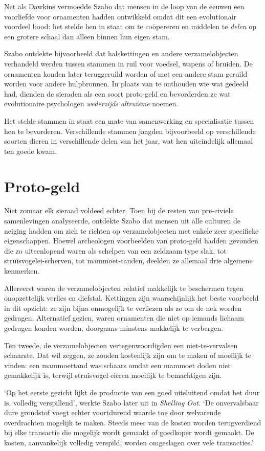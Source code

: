 \documentclass[
  a5paper,
  smalldemyvopaper,11pt,twoside,onecolumn,openright,extrafontsizes,
hidelinks]{memoir}
\begin{document}
Net als Dawkins vermoedde Szabo dat mensen in de loop van de eeuwen een
voorliefde voor ornamenten hadden ontwikkeld omdat dit een evolutionair
voordeel bood: het stelde hen in staat om te coöpereren en middelen te
\emph{delen} op een grotere schaal dan alleen binnen hun eigen stam.

Szabo ontdekte bijvoorbeeld dat halskettingen en andere verzamelobjecten
verhandeld werden tussen stammen in ruil voor voedsel, wapens of
bruiden. De ornamenten konden later teruggeruild worden of met een
andere stam geruild worden voor andere hulpbronnen. In plaats van te
onthouden wie wat gedeeld had, dienden de sieraden als een soort
proto-geld en bevorderden ze wat evolutionaire psychologen
\emph{wederzijds altruïsme} noemen.

Het stelde stammen in staat een mate van samenwerking en specialisatie
tussen hen te bevorderen. Verschillende stammen jaagden bijvoorbeeld op
verschillende soorten dieren in verschillende delen van het jaar, wat
hen uiteindelijk allemaal ten goede kwam.

\section{Proto-geld}\label{proto-geld}

Niet zomaar elk sieraad voldeed echter. Toen hij de resten van
pre-civiele samenlevingen analyseerde, ontdekte Szabo dat mensen uit
alle culturen de neiging hadden om zich te richten op verzamelobjecten
met enkele zeer specifieke eigenschappen. Hoewel archeologen voorbeelden
van proto-geld hadden gevonden die zo uiteenlopend waren als schelpen
van een zeldzaam type slak, tot struisvogelei-scherven, tot
mammoet-tanden, deelden ze allemaal drie algemene kenmerken.

Allereerst waren de verzamelobjecten relatief makkelijk te beschermen
tegen onopzettelijk verlies en diefstal. Kettingen zijn waarschijnlijk
het beste voorbeeld in dit opzicht: ze zijn bijna onmogelijk te
verliezen als ze om de nek worden gedragen. Alternatief gezien, waren
ornamenten die niet op iemands lichaam gedragen konden worden, doorgaans
minstens makkelijk te verbergen.

Ten tweede, de verzamelobjecten vertegenwoordigden een niet-te-vervalsen
schaarste. Dat wil zeggen, ze zouden kostenlijk zijn om te maken of
moeilijk te vinden: een mammoettand was schaars omdat een mammoet doden
niet gemakkelijk is, terwijl struisvogel eieren moeilijk te bemachtigen
zijn.

`Op het eerste gezicht lijkt de productie van een goed uitsluitend omdat
het duur is, volledig verspillend', werkte Szabo later uit in
\emph{Shelling Out}. `De onvervalsbaar dure grondstof voegt echter
voortdurend waarde toe door welvarende overdrachten mogelijk te maken.
Steeds meer van de kosten worden terugverdiend bij elke transactie die
mogelijk wordt gemaakt of goedkoper wordt gemaakt. De kosten,
aanvankelijk volledig verspild, worden omgeslagen over vele
transacties.'
\end{document}
